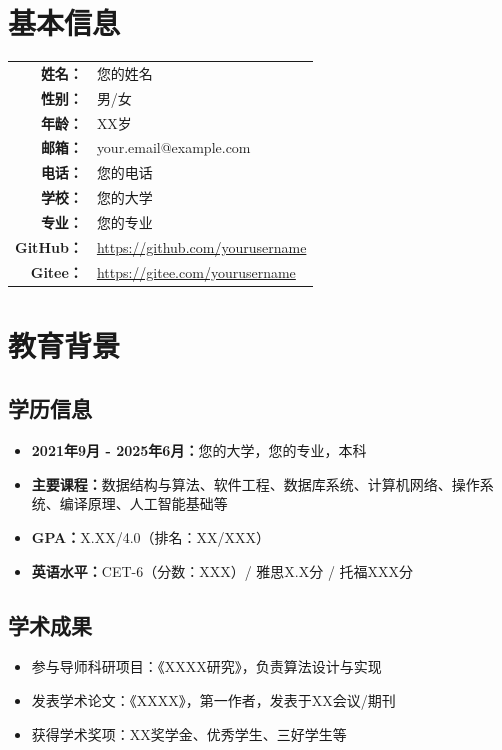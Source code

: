 \documentclass[a4paper,12pt]{article}
\makeatletter
\newcommand{\studentname}{您的姓名}
\newcommand{\studentemail}{your.email@example.com}
\newcommand{\studentphone}{您的电话}
\newcommand{\studentuniversity}{您的大学}
\newcommand{\studentmajor}{您的专业}
\makeatother
\begin{document}
\tableofcontents
\newpage

\section{基本信息}

\begin{table}[H]
\centering
\begin{tabular}{rl}
    \textbf{姓名：} & \studentname \\[0.2cm]
    \textbf{性别：} & 男/女 \\[0.1cm]
    \textbf{年龄：} & XX岁 \\[0.1cm]
    \textbf{邮箱：} & \studentemail \\[0.1cm]
    \textbf{电话：} & \studentphone \\[0.1cm]
    \textbf{学校：} & \studentuniversity \\[0.1cm]
    \textbf{专业：} & \studentmajor \\[0.1cm]
    \textbf{GitHub：} & \url{https://github.com/yourusername} \\[0.1cm]
    \textbf{Gitee：} & \url{https://gitee.com/yourusername} \\
\end{tabular}
\end{table}

\section{教育背景}

\subsection{学历信息}
\begin{itemize}
    \item \textbf{2021年9月 - 2025年6月：}\studentuniversity，\studentmajor，本科
    \item \textbf{主要课程：}数据结构与算法、软件工程、数据库系统、计算机网络、操作系统、编译原理、人工智能基础等
    \item \textbf{GPA：}X.XX/4.0（排名：XX/XXX）
    \item \textbf{英语水平：}CET-6（分数：XXX）/ 雅思X.X分 / 托福XXX分
\end{itemize}

\subsection{学术成果}
\begin{itemize}
    \item 参与导师科研项目：《XXXX研究》，负责算法设计与实现
    \item 发表学术论文：《XXXX》，第一作者，发表于XX会议/期刊
    \item 获得学术奖项：XX奖学金、优秀学生、三好学生等
\end{itemize}
\end{document}
